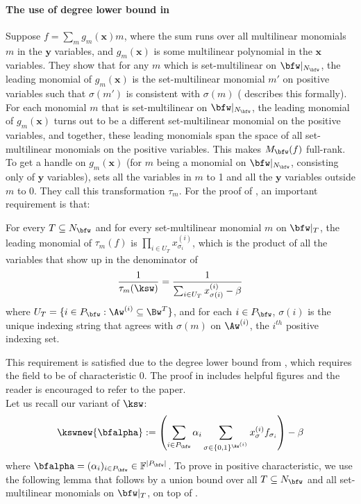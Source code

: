 \documentclass[11pt]{article}
\newcommand{\Boo}{\{0,1 \}}
\newcommand{\F}{\mathbb{F}}
\begin{document}
\paragraph{The use of degree lower bound in \cite{GHT}} Suppose $f = \sum_{m}g_m(\mathbf{x})m$, where the sum runs over all multilinear monomials $m$ in the $\mathbf{y}$ variables, and $g_m(\mathbf{x})$ is some multilinear polynomial in the $\mathbf{x}$ variables. They show that for any $m$ which is set-multilinear on $\bfw|_{N_\bfw}$, the leading monomial of $g_m(\mathbf{x})$ is the set-multilinear monomial $m'$ on positive variables such that $\sigma(m')$ is consistent with $\sigma(m)$ (\cite{GHT} describes this formally). For each monomial $m$ that is set-multilinear on $\bfw|_{N_\bfw}$, the leading monomial of $g_m(\mathbf{x})$ turns out to be a different set-multilinear monomial on the positive variables, and together, these leading monomials span the space of all set-multilinear monomials on the positive variables. This makes $M_\bfw(f)$ full-rank. To get a handle on $g_m(\mathbf{x})$ (for $m$ being a monomial on $\bfw|_{N_\bfw}$, consisting only of $\mathbf{y}$ variables), \cite{GHT} sets all the variables in $m$ to 1 and all the $\mathbf{y}$ variables outside $m$ to 0. They call this transformation $\tau_m$. For the proof of , an important requirement is that:
\begin{displayquote}For every $T\subseteq N_\bfw$ and for every set-multilinear monomial $m$ on $\bfw|_T$, the leading monomial of $\tau_m(f)$ is $\prod_{i\in U_T}x_{\sigma_i}^{(i)}$, which is the product of all the variables that show up in the denominator of $$\frac{1}{\tau_m(\ksw)} = \frac{1}{\sum_{i\in U_T}x_{\sigma(i)}^{(i)} - \beta}$$ where $U_T = \{i \in P_\bfw: \Aw^{(i)} \subseteq \Bw^T\}$, and for each $i \in P_\bfw$, $\sigma(i)$ is the unique indexing string that agrees with $\sigma(m)$ on $\Aw^{(i)}$, the $i^{th}$ positive indexing set.
\end{displayquote}
This requirement is satisfied due to the degree lower bound from \cite{FSTW21}, which requires the field to be of characteristic 0. The proof in \cite{GHT} includes helpful figures and the reader is encouraged to refer to the paper.\\
Let us recall our variant of $\ksw$:
\begin{equation}
    \kswnew{\bfalpha}:= \left ( \sum_{i\in P_\bfw}\alpha_i\sum_{\sigma \in \Boo^{\Aw^{(i)}}} x_{\sigma}^{(i)}f_{\sigma_i} \right ) - \beta
\end{equation}
where $\bfalpha = (\alpha_i)_{i\in P_\bfw} \in \F^{|P_\bfw|}$. To prove  in positive characteristic, we use the following lemma that follows by a union bound over all $T\subseteq N_\bfw$ and all set-multilinear monomials on $\bfw|_{T}$, on top of .
\end{document}
